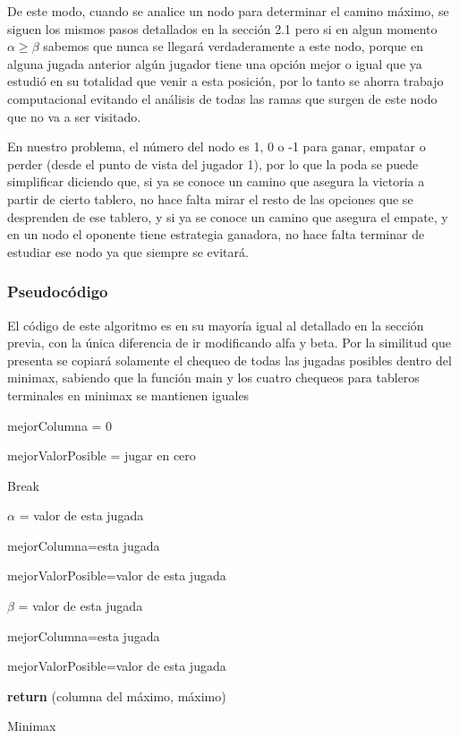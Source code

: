 \documentclass[A4paper,oneside,fleqn,11pt]{article}
\theoremstyle{definition}
\begin{document}
De este modo, cuando se analice un nodo para determinar el camino máximo, se siguen los mismos pasos detallados en la sección 2.1 pero si en algun momento $\alpha \geq \beta$ sabemos que nunca se llegará verdaderamente a este nodo, porque en alguna jugada anterior algún jugador tiene una opción mejor o igual que ya estudió en su totalidad que venir a esta posición, por lo tanto se ahorra trabajo computacional evitando el análisis de todas las ramas que surgen de este nodo que no va a ser visitado.

En nuestro problema, el número del nodo es 1, 0 o -1 para ganar, empatar o perder (desde el punto de vista del jugador 1), por lo que la poda se puede simplificar diciendo que, si ya se conoce un camino que asegura la victoria a partir de cierto tablero, no hace falta mirar el resto de las opciones que se desprenden de ese tablero, y si ya se conoce un camino que asegura el empate, y en un nodo el oponente tiene estrategia ganadora, no hace falta terminar de estudiar ese nodo ya que siempre se evitará.



\subsubsection{Pseudocódigo}
El código de este algoritmo es en su mayoría igual al detallado en la sección previa, con la única diferencia de ir modificando alfa y beta. Por la similitud que presenta se copiará solamente el chequeo de todas las jugadas posibles dentro del minimax, sabiendo que la función main y los cuatro chequeos para tableros terminales en minimax se mantienen iguales

\newpage

\begin{algorithm}



		mejorColumna = 0

		mejorValorPosible = jugar en cero

			{
				\If{ $\alpha \geq \beta$}				
					{
					Break
					}

					{
		  	  			{
						$\alpha$ = valor de esta jugada

						mejorColumna=esta jugada

						mejorValorPosible=valor de esta jugada
						}
					}
					{
		  	  			{
						$\beta$ = valor de esta jugada

						mejorColumna=esta jugada

						mejorValorPosible=valor de esta jugada
						}
					}
			}
		\textbf{return} (columna del máximo, máximo)
		

\caption{Minimax}
\end{algorithm}
\end{document}
